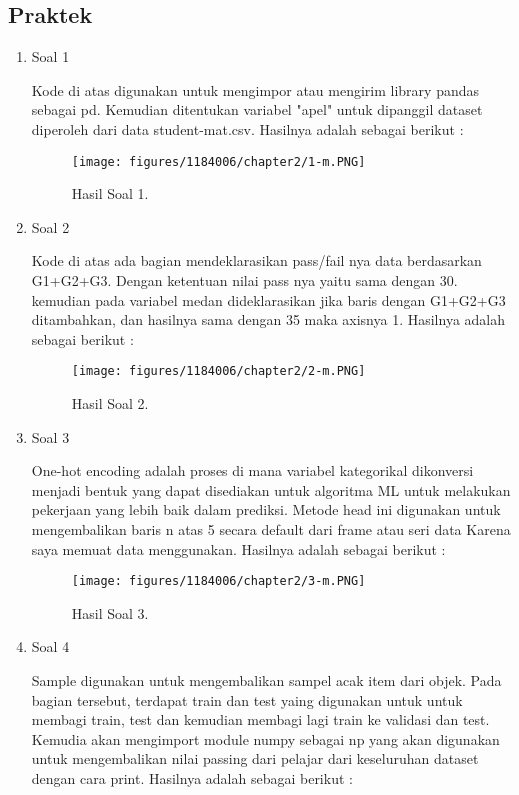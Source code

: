 \subsection{Praktek}
\begin{enumerate}
	\item Soal 1
	\hfill\break
	
	Kode di atas digunakan untuk mengimpor atau mengirim library pandas sebagai pd. Kemudian ditentukan variabel "apel" untuk dipanggil dataset diperoleh dari data student-mat.csv. Hasilnya adalah sebagai berikut :
	\begin{figure}[h]
	\centering
		\texttt{[image: figures/1184006/chapter2/1-m.PNG]}
		\caption{Hasil Soal 1.}
	\end{figure}
	\item Soal 2
	\hfill\break
	
	Kode di atas ada bagian mendeklarasikan pass/fail nya data berdasarkan G1+G2+G3. Dengan ketentuan nilai pass nya yaitu sama dengan 30. kemudian pada variabel medan dideklarasikan jika baris dengan G1+G2+G3 ditambahkan, dan hasilnya sama dengan 35 maka axisnya 1. Hasilnya adalah sebagai berikut :
	\begin{figure}[h]
	\centering
		\texttt{[image: figures/1184006/chapter2/2-m.PNG]}
		\caption{Hasil Soal 2.}
	\end{figure}
	\item Soal 3
	\hfill\break
	
	One-hot encoding adalah proses di mana variabel kategorikal dikonversi menjadi bentuk yang dapat disediakan untuk algoritma ML untuk melakukan pekerjaan yang lebih baik dalam prediksi. Metode head ini digunakan untuk mengembalikan baris n atas 5 secara default dari frame atau seri data Karena saya memuat data menggunakan. Hasilnya adalah sebagai berikut :
	\begin{figure}[h]
	\centering
		\texttt{[image: figures/1184006/chapter2/3-m.PNG]}
		\caption{Hasil Soal 3.}
	\end{figure}
	\item Soal 4
	\hfill\break
	
	Sample digunakan untuk mengembalikan sampel acak item dari objek. Pada bagian tersebut, terdapat train dan test yaing digunakan untuk untuk membagi train, test dan kemudian membagi lagi train ke validasi dan test. Kemudia akan mengimport module numpy sebagai np yang akan digunakan untuk mengembalikan nilai passing dari pelajar dari keseluruhan dataset dengan cara print. Hasilnya adalah sebagai berikut :

\end{enumerate}
